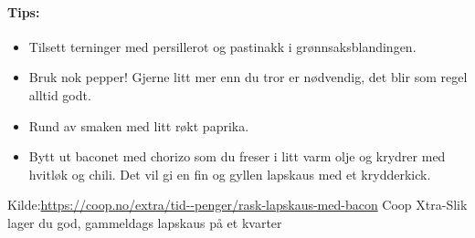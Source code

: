 \paragraph{Tips:}
\begin{itemize}[noitemsep]
  \item Tilsett terninger med persillerot og pastinakk i grønnsaksblandingen.
  \item Bruk nok pepper! Gjerne litt mer enn du tror er nødvendig, det blir som regel alltid godt.
  \item Rund av smaken med litt røkt paprika.
  \item   Bytt ut baconet med chorizo som du freser i litt varm olje og krydrer med hvitløk og chili. Det vil gi en fin og gyllen lapskaus med et krydderkick.
\end{itemize}

Kilde:\url{https://coop.no/extra/tid--penger/rask-lapskaus-med-bacon} Coop Xtra-Slik lager du god, gammeldags lapskaus på et kvarter
